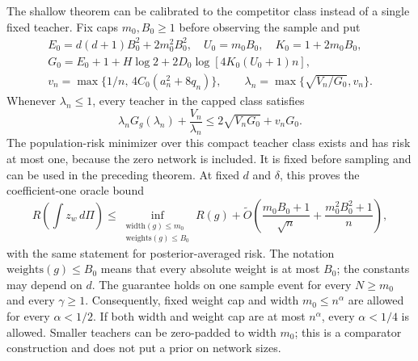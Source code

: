 The shallow theorem can be calibrated to the competitor class instead
of a single fixed teacher.  Fix caps $m_0,B_0\geq1$ before observing the
sample and put
\begin{gather*}
 E_0=d(d+1)B_0^2+2m_0^2B_0^2,\quad U_0=m_0B_0,\quad K_0=1+2m_0B_0,\\
 G_0=E_0+1+H\log2+2D_0\log[4K_0(U_0+1)n],\\
 v_n=\max\{1/n,\,4C_0(a_n^2+8q_n)\},\qquad
 \lambda_n=\max\{\sqrt{V_n/G_0},v_n\}.
\end{gather*}
Whenever $\lambda_n\leq1$, every teacher in the capped class satisfies
\[
 \lambda_nG_g(\lambda_n)+\frac{V_n}{\lambda_n}
       \leq2\sqrt{V_nG_0}+v_nG_0.
\]
The population-risk minimizer over this compact teacher class exists
and has risk at most one, because the zero network is included.  It is
fixed before sampling and can be used in the preceding theorem.  At
fixed $d$ and $\delta$, this proves the coefficient-one oracle bound
\[
 R\left(\int z_w\,d\Pi\right)
 \leq\inf_{\substack{\mathrm{width}(g)\leq m_0\\
                     \mathrm{weights}(g)\leq B_0}}R(g)
 +\widetilde O\left(\frac{m_0B_0+1}{\sqrt n}
                         +\frac{m_0^2B_0^2+1}{n}\right),
\]
with the same statement for posterior-averaged risk.  The notation
$\mathrm{weights}(g)\leq B_0$ means that every absolute weight is at
most $B_0$; the constants may depend on $d$.  The guarantee holds on
one sample event for every $N\geq m_0$ and every $\gamma\geq1$.
Consequently, fixed weight cap and width $m_0\leq n^\alpha$ are allowed
for every $\alpha<1/2$.  If both width and weight cap are at most
$n^\alpha$, every $\alpha<1/4$ is allowed.  Smaller teachers can be
zero-padded to width $m_0$; this is a comparator construction and does
not put a prior on network sizes.
